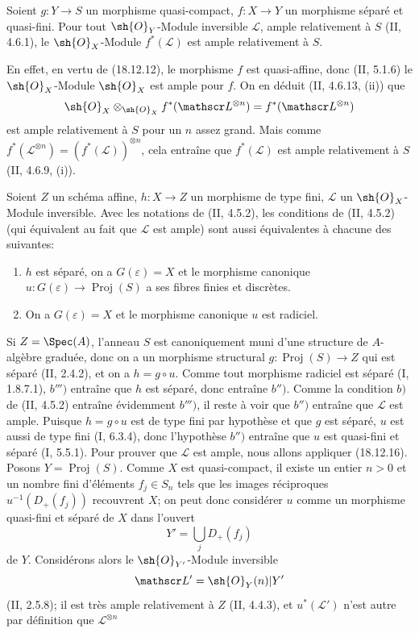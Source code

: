 \begin{proposition}[18.12.16]
\label{IV.18.12.16}
Soient $g:Y\to S$ un morphisme quasi-compact, $f:X\to Y$ un morphisme séparé et quasi-fini. Pour tout $\sh{O}_Y$-Module inversible $\mathscr L$, ample relativement à $S$ (II, 4.6.1), le $\sh{O}_X$-Module $f^*(\mathscr L)$ est ample relativement à $S$.
\end{proposition}

En effet, en vertu de (18.12.12), le morphisme $f$ est quasi-affine, donc (II, 5.1.6) le $\sh{O}_X$-Module $\sh{O}_X$ est ample pour $f$. On en déduit (II, 4.6.13, (ii)) que
\[
  \sh{O}_X\otimes_{\sh{O}_X}f^*(\mathscr L^{\otimes n})=f^*(\mathscr L^{\otimes n})
\]
est ample relativement à $S$ pour un $n$ assez grand. Mais comme $f^*(\mathscr L^{\otimes n})=(f^*(\mathscr L))^{\otimes n}$, cela entraîne que $f^*(\mathscr L)$ est ample relativement à $S$ (II, 4.6.9, (i)).

\begin{corollary}[18.12.17]
\label{IV.18.12.17}
Soient $Z$ un schéma affine, $h:X\to Z$ un morphisme de type fini, $\mathscr L$ un $\sh{O}_X$-Module inversible. Avec les notations de (II, 4.5.2), les conditions de (II, 4.5.2) (qui équivalent au fait que $\mathscr L$ est ample) sont aussi équivalentes à chacune des suivantes:
\begin{enumerate}
  \item[$b'')$] $h$ est séparé, on a $G(\varepsilon)=X$ et le morphisme canonique $u:G(\varepsilon)\to\operatorname{Proj}(S)$ a ses fibres finies et discrètes.
  \item[$b''')$] On a $G(\varepsilon)=X$ et le morphisme canonique $u$ est radiciel.
\end{enumerate}
\end{corollary}

Si $Z=\Spec(A)$, l'anneau $S$ est canoniquement muni d'une structure de $A$-algèbre graduée, donc on a un morphisme structural $g:\operatorname{Proj}(S)\to Z$ qui est séparé (II, 2.4.2), et on a $h=g\circ u$. Comme tout morphisme radiciel est séparé (I, 1.8.7.1), $b''')$ entraîne que $h$ est séparé, donc entraîne $b'')$. Comme la condition $b)$ de (II, 4.5.2) entraîne évidemment $b''')$, il reste à voir que $b'')$ entraîne que $\mathscr L$ est ample. Puisque $h=g\circ u$ est de type fini par hypothèse et que $g$ est séparé, $u$ est aussi de type fini (I, 6.3.4), donc l'hypothèse $b'')$ entraîne que $u$ est quasi-fini et séparé (I, 5.5.1). Pour prouver que $\mathscr L$ est ample, nous allons appliquer (18.12.16). Posons $Y=\operatorname{Proj}(S)$. Comme $X$ est quasi-compact, il existe un entier $n>0$ et un nombre fini d'éléments $f_j\in S_n$ tels que les images réciproques $u^{-1}(D_+(f_j))$ recouvrent $X$; on peut donc considérer $u$ comme un morphisme quasi-fini et séparé de $X$ dans l'ouvert
\[
  Y'=\bigcup_j D_+(f_j)
\]
de $Y$. Considérons alors le $\sh{O}_{Y'}$-Module inversible
\[
  \mathscr L'=\sh{O}_Y(n)|Y'
\]
(II, 2.5.8); il est très ample relativement à $Z$ (II, 4.4.3), et $u^*(\mathscr L')$ n'est autre par définition que $\mathscr L^{\otimes n}$

